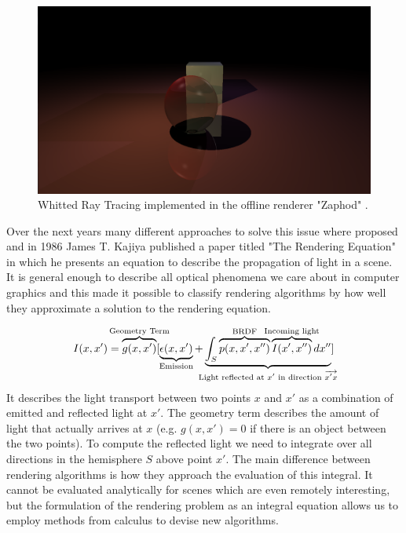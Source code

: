 \documentclass{ACGSeminar}
\begin{document}
\begin{figure}[htb!]
  \begin{centering}
    \includegraphics[width=12cm,natwidth=1280,natheight=720]{figures/whitted_raytracing.png}\par
  \end{centering}
  \caption{Whitted Ray Tracing implemented in the offline renderer "Zaphod" \cite{Zaphod}.}
  \label{fig:whitted-example}
\end{figure}


Over the next years many different approaches to solve this issue where proposed and in 1986 James T. Kajiya published a paper titled "The Rendering Equation"  \cite{Kajiya:1986} in which he presents an equation to describe the propagation of light in a scene. It is general enough to describe all optical phenomena we care about in computer graphics and this made it possible to classify rendering algorithms by how well they approximate a solution to the rendering equation.

\begin{equation} \label{eq:rendering-equation}
I(x,x')= \overbrace{g(x,x')}^{\mathclap{\text{Geometry Term}}}
         [
         \underbrace{\epsilon(x,x')}_{\mathclap{\text{Emission}}}
         + \underbrace{
         \int_{S}{\overbrace{p(x,x',x'')}^{\mathclap{\text{BRDF}}}
                  \overbrace{I(x',x'') }^{\mathclap{\text{Incoming light}}} dx''}
         }_{\mathclap{\text{Light reflected at $x'$ in direction $\overrightarrow{x'x}$}}} ]
\end{equation}
It describes the light transport between two points $x$ and $x'$ as a combination of emitted and reflected light at $x'$. The geometry term describes the amount of light that actually arrives at $x$ (e.g. $g(x,x') = 0$ if there is an object between the two points). To compute the reflected light we need to integrate over all directions in the hemisphere $S$ above point $x'$. 
The main difference between rendering algorithms is how they approach the evaluation of this integral. It cannot be evaluated analytically for scenes which are even remotely interesting, but the formulation of the rendering problem as an integral equation allows us to employ methods from calculus to devise new algorithms.
\end{document}
